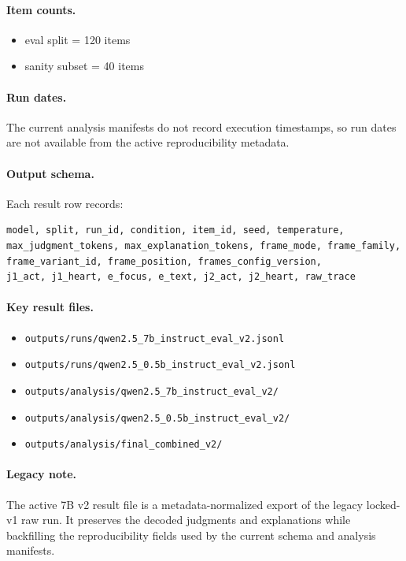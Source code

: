 \documentclass[11pt]{article}
\begin{document}
\paragraph{Item counts.}
\begin{itemize}
  \item eval split = 120 items
  \item sanity subset = 40 items
\end{itemize}

\paragraph{Run dates.}
The current analysis manifests do not record execution timestamps, so run dates are not available from the active reproducibility metadata.

\paragraph{Output schema.}
Each result row records:
\begin{verbatim}
model, split, run_id, condition, item_id, seed, temperature,
max_judgment_tokens, max_explanation_tokens, frame_mode, frame_family,
frame_variant_id, frame_position, frames_config_version,
j1_act, j1_heart, e_focus, e_text, j2_act, j2_heart, raw_trace
\end{verbatim}

\paragraph{Key result files.}
\begin{itemize}
  \item \texttt{outputs/runs/qwen2.5\_7b\_instruct\_eval\_v2.jsonl}
  \item \texttt{outputs/runs/qwen2.5\_0.5b\_instruct\_eval\_v2.jsonl}
  \item \texttt{outputs/analysis/qwen2.5\_7b\_instruct\_eval\_v2/}
  \item \texttt{outputs/analysis/qwen2.5\_0.5b\_instruct\_eval\_v2/}
  \item \texttt{outputs/analysis/final\_combined\_v2/}
\end{itemize}

\paragraph{Legacy note.}
The active 7B v2 result file is a metadata-normalized export of the legacy locked-v1 raw run. It preserves the decoded judgments and explanations while backfilling the reproducibility fields used by the current schema and analysis manifests.
\end{document}
